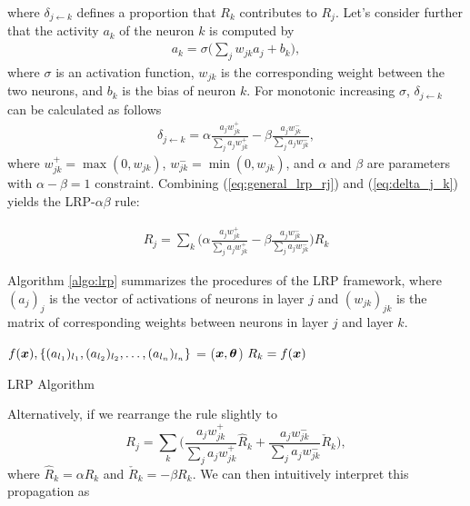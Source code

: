 where $\delta_{j\leftarrow k}$ defines a proportion that  $R_{k}$ contributes to $R_j$. Let's consider further that the activity $a_k$ of the neuron $k$ is computed by 
\begin{align*}
	a_k = \sigma \bigg( \sum_{j} w_{jk} a_j + b_k \bigg),
\end{align*}
where $\sigma$ is an activation function, $w_{jk}$ is the corresponding weight between the two neurons, and $b_k$ is the bias of neuron $k$. For monotonic increasing $\sigma$, $\delta_{j\leftarrow k}$ can be calculated as follows 
\begin{align} \label{eq:delta_j_k}
	\delta_{j\leftarrow k} = \alpha\frac{a_j w_{jk}^+}{\sum_{j} a_jw_{jk}^+} - \beta\frac{a_j w_{jk}^-}{\sum_{j} a_jw_{jk}^-},
\end{align}
where $w_{jk}^+ = \max(0, w_{jk})$, $w_{jk}^- = \min(0, w_{jk})$, and $\alpha$ and $\beta$ are parameters with $\alpha-\beta = 1$ constraint. Combining (\ref{eq:general_lrp_rj}) and (\ref{eq:delta_j_k}) yields the LRP-$\alpha\beta$ rule:

\begin{align*}
	R_j = \sum_{k} 	\bigg( \alpha\frac{a_j w_{jk}^+}{\sum_{j} a_jw_{jk}^+} - \beta\frac{a_j w_{jk}^-}{\sum_{j} a_jw_{jk}^-} \bigg )  R_{k}
\end{align*}

Algorithm \ref{algo:lrp} summarizes the procedures of the LRP framework, where $(a_j)_j$ is the vector of activations of neurons in layer $j$ and $(w_{jk})_{jk}$ is the matrix of corresponding weights between neurons in layer $j$ and layer $k$.

\begin{algorithm}[H]
$f(\patvector{x}), \{ (a_{l_1})_{l_1}, (a_{l_2})_{l_2}, \dots, (a_{l_n})_{l_n}\}$ = ($\patvector{x}, \patvector{\theta}$)\;
$R_k = f(\patvector{x})$\;
 \caption{LRP Algorithm}
 \label{algo:lrp}
\end{algorithm}

Alternatively, if we rearrange the rule slightly to 
$$
	R_j = \sum_{k} \bigg( \frac{a_j w_{jk}^+}{\sum_{j} a_jw_{jk}^+} \hat{R}_{k} + \frac{a_j w_{jk}^-}{\sum_{j} a_jw_{jk}^-} \check{R}_{k} \bigg),
$$ 
where $\hat{R}_{k}  = \alpha R_{k}$ and  $\check{R}_{k} = -\beta R_{k} $. We can then intuitively interpret this propagation as 

